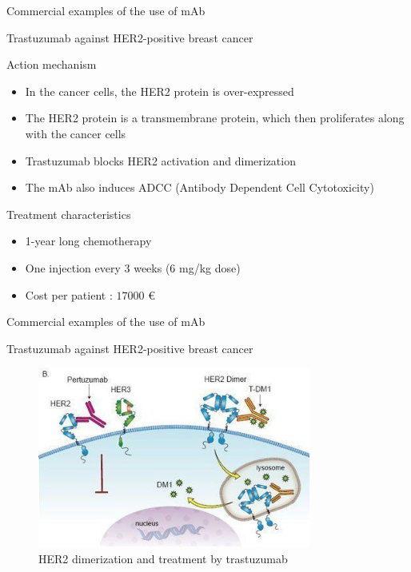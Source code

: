 \begin{frame}{Commercial examples of the use of mAb}
    \begin{block}{Trastuzumab against HER2-positive breast cancer}
        
        \begin{exampleblock}{Action mechanism}
            \begin{itemize}
                \item In the cancer cells, the HER2 protein is over-expressed
                \item The HER2 protein is a transmembrane protein, which then
                        proliferates along with the cancer cells
                \item Trastuzumab blocks HER2 activation and dimerization 
                \item The mAb also induces ADCC (Antibody Dependent Cell Cytotoxicity)
            \end{itemize}
        \end{exampleblock}

        \begin{exampleblock}{Treatment characteristics}
            \begin{itemize}
                \item 1-year long chemotherapy
                \item One injection every 3 weeks ($6$ mg/kg dose)
                \item Cost per patient : $17000$ €
            \end{itemize}
        \end{exampleblock}
    \end{block}

\end{frame}

\begin{frame}{Commercial examples of the use of mAb}
    \begin{block}{Trastuzumab against HER2-positive breast cancer}
        \begin{figure}
            \centering
            \includegraphics[width=0.8\textwidth]{../Images/her2_pertuzumab.jpg}
            \caption{HER2 dimerization and treatment by trastuzumab}
        \end{figure}
    \end{block}
\end{frame}


